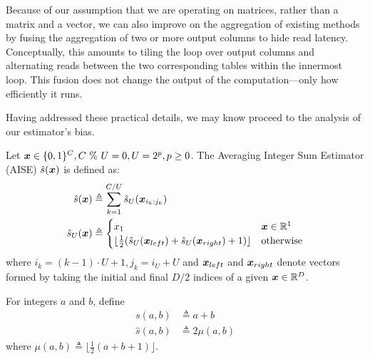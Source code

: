 Because of our assumption that we are operating on matrices, rather than a matrix and a vector, we can also improve on the aggregation of existing methods \cite{bolt, quickAdc, quickerAdc} by fusing the aggregation of two or more output columns to hide read latency. Conceptually, this amounts to tiling the loop over output columns and alternating reads between the two corresponding tables within the innermost loop. This fusion does not change the output of the computation---only how efficiently it runs.

Having addressed these practical details, we may know proceed to the analysis of our estimator's bias.

\begin{definition}
Let $\bm{x} \in \{0, 1\}^C, C \text{ \% } U = 0, U = 2^p, p \ge 0$. The Averaging Integer Sum Estimator (AISE) $\hat{s}(\bm{x})$ is defined as:
\begin{align}
    \hat{s}(\bm{x}) &\triangleq \sum_{k=1}^{C / U} \hat{s}_U(\bm{x}_{i_k:j_k}) \\
    \hat{s}_U(\bm{x}) &\triangleq
        \begin{cases}
            x_1 & \bm{x} \in \mathbb{R}^1 \\
             \lfloor \frac{1}{2}(\hat{s}_U(\bm{x}_{left}) + \hat{s}_U(\bm{x}_{right}) + 1) \rfloor & \text{otherwise}
       \end{cases}
\end{align}
where $i_k = (k-1) \cdot U+1, j_k = i_U + U$ and $\bm{x}_{left}$ and $\bm{x}_{right}$ denote vectors formed by taking the initial and final $D/2$ indices of a given $\bm{x} \in \mathbb{R}^D$.
\end{definition}

\begin{definition}
For integers $a$ and $b$, define
\begin{align}
    s(a, b) &\triangleq a + b \\
    \hat{s}(a, b) &\triangleq 2 \mu(a, b)
\end{align}
where $\mu(a, b) \triangleq \lfloor \frac{1}{2}(a + b + 1) \rfloor$.
\end{definition}

